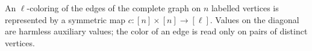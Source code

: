 \begin{definition}
An $\ell$-coloring of the edges of the complete graph on $n$ labelled
vertices is represented by a symmetric map
$c:[n]\times[n]\to[\ell]$.  Values on the diagonal are harmless auxiliary
values; the color of an edge is read only on pairs of distinct vertices.
\end{definition}

